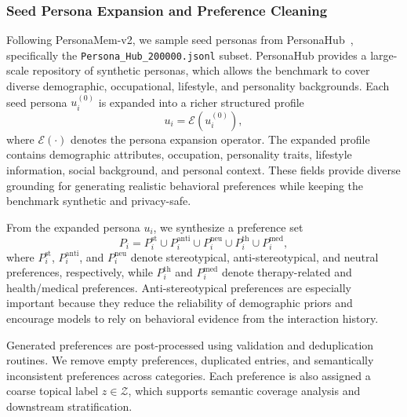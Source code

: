 \documentclass{llmxive}
\begin{document}
\subsubsection{Seed Persona Expansion and Preference Cleaning}
\label{app:persona_seed_preferences}
Following PersonaMem-v2, we sample seed personas from PersonaHub~\cite{ge2024scaling}, specifically the \texttt{Persona\_Hub\_200000.jsonl} subset. PersonaHub provides a large-scale repository of synthetic personas, which allows the benchmark to cover diverse demographic, occupational, lifestyle, and personality backgrounds. Each seed persona $u_i^{(0)}$ is expanded into a richer structured profile
\[
u_i = \mathcal{E}\!\left(u_i^{(0)}\right),
\]
where $\mathcal{E}(\cdot)$ denotes the persona expansion operator. The expanded profile contains demographic attributes, occupation, personality traits, lifestyle information, social background, and personal context. These fields provide diverse grounding for generating realistic behavioral preferences while keeping the benchmark synthetic and privacy-safe.

From the expanded persona $u_i$, we synthesize a preference set
\[
P_i =
P_i^{\mathrm{st}}
\cup
P_i^{\mathrm{anti}}
\cup
P_i^{\mathrm{neu}}
\cup
P_i^{\mathrm{th}}
\cup
P_i^{\mathrm{med}},
\]
where $P_i^{\mathrm{st}}$, $P_i^{\mathrm{anti}}$, and $P_i^{\mathrm{neu}}$ denote stereotypical, anti-stereotypical, and neutral preferences, respectively, while $P_i^{\mathrm{th}}$ and $P_i^{\mathrm{med}}$ denote therapy-related and health/medical preferences. Anti-stereotypical preferences are especially important because they reduce the reliability of demographic priors and encourage models to rely on behavioral evidence from the interaction history.

Generated preferences are post-processed using validation and deduplication routines. We remove empty preferences, duplicated entries, and semantically inconsistent preferences across categories. Each preference is also assigned a coarse topical label $z \in \mathcal{Z}$, which supports semantic coverage analysis and downstream stratification.
\end{document}
